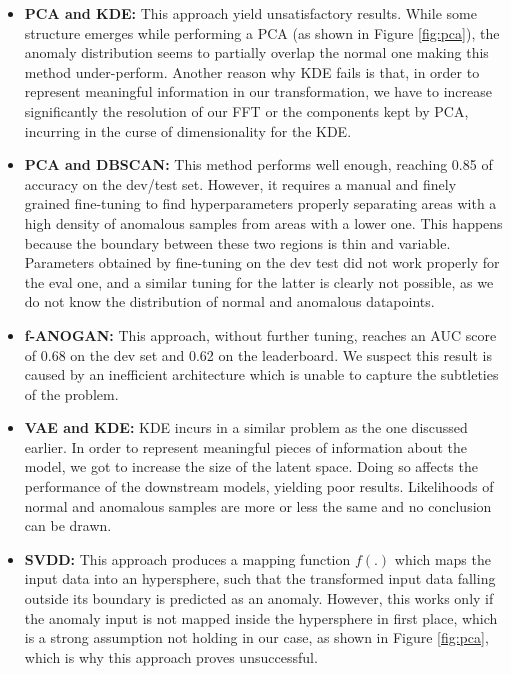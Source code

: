 \documentclass{article}
\begin{document}
\begin{itemize}
	\item \textbf{PCA and KDE:} This approach yield unsatisfactory results. While some structure emerges while performing a PCA (as shown in Figure \ref{fig:pca}), the anomaly distribution seems to partially overlap the normal one making this method under-perform. Another reason why KDE fails is that, in order to represent meaningful information in our transformation, we have to increase significantly the resolution of our FFT or the components kept by PCA, incurring in the curse of dimensionality for the KDE.
	
	\item \textbf{PCA and DBSCAN:} This method performs well enough, reaching 0.85 of accuracy on the dev/test set. However, it requires a manual and finely grained fine-tuning to find hyperparameters properly separating areas with a high density of anomalous samples from areas with a lower one. This happens because the boundary between these two regions is thin and variable. Parameters obtained by fine-tuning on the dev test did not work properly for the eval one, and a similar tuning for the latter is clearly not possible, as we do not know the distribution of normal and anomalous datapoints.
	
	\item  \textbf{f-ANOGAN:} This approach, without further tuning, reaches an AUC score of 0.68 on the dev set and 0.62 on the leaderboard. We suspect this result is caused by an inefficient architecture which is unable to capture the subtleties of the problem.
	
	\item \textbf{VAE and KDE:} KDE incurs in a similar problem as the one discussed earlier. In order to represent meaningful pieces of information about the model, we got to increase the size of the latent space. Doing so affects the performance of the downstream models, yielding poor results. Likelihoods of normal and anomalous samples are more or less the same and no conclusion can be drawn.
	\item \textbf{SVDD:} This approach produces a mapping function $f(.)$ which maps the input data into an hypersphere, such that the transformed input data falling outside its boundary is predicted as an anomaly. However, this works only if the anomaly input is not mapped inside the hypersphere in first place, which is a strong assumption not holding in our case, as shown in Figure \ref{fig:pca}, which is why this approach proves unsuccessful. 
	

\end{itemize}
\end{document}
